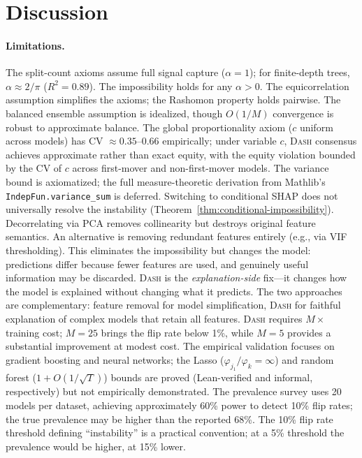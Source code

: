 \documentclass{jmlr}
\newcommand{\DASH}{\textsc{Dash}}
\begin{document}

\section{Discussion}
\label{sec:discussion}

\paragraph{Limitations.}
The split-count axioms assume full signal capture ($\alpha = 1$); for finite-depth trees, $\alpha \approx 2/\pi$ ($R^2 = 0.89$). The impossibility holds for any $\alpha > 0$.
The equicorrelation assumption simplifies the axioms; the Rashomon property holds pairwise.
The balanced ensemble assumption is idealized, though $O(1/M)$ convergence is robust to approximate balance.
The global proportionality axiom ($c$ uniform across models) has CV $\approx 0.35$--$0.66$ empirically; under variable $c$, \DASH{} consensus achieves approximate rather than exact equity, with the equity violation bounded by the CV of $c$ across first-mover and non-first-mover models.
The variance bound is axiomatized; the full measure-theoretic derivation from Mathlib's \texttt{IndepFun.variance\_sum} is deferred.
Switching to conditional SHAP does not universally resolve the instability (Theorem~\ref{thm:conditional-impossibility}).
Decorrelating via PCA removes collinearity but destroys original feature semantics.
An alternative is removing redundant features entirely (e.g., via VIF thresholding). This eliminates the impossibility but changes the model: predictions differ because fewer features are used, and genuinely useful information may be discarded. \DASH{} is the \emph{explanation-side} fix---it changes how the model is explained without changing what it predicts. The two approaches are complementary: feature removal for model simplification, \DASH{} for faithful explanation of complex models that retain all features.
\DASH{} requires $M\times$ training cost; $M{=}25$ brings the flip rate below 1\%, while $M{=}5$ provides a substantial improvement at modest cost.
The empirical validation focuses on gradient boosting and neural networks; the Lasso ($\varphi_{j_1}/\varphi_k = \infty$) and random forest ($1 + O(1/\sqrt{T})$) bounds are proved (Lean-verified and informal, respectively) but not empirically demonstrated.
The prevalence survey uses 20 models per dataset, achieving approximately 60\% power to detect 10\% flip rates; the true prevalence may be higher than the reported 68\%.
The 10\% flip rate threshold defining ``instability'' is a practical convention; at a 5\% threshold the prevalence would be higher, at 15\% lower.
\end{document}

